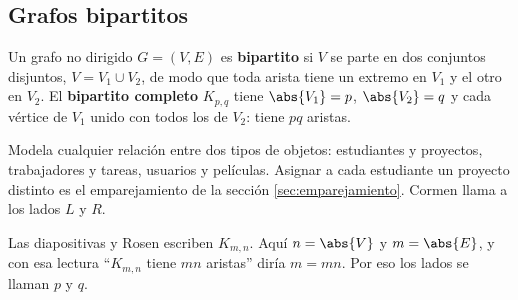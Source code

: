 \documentclass[11pt,letterpaper]{article}
\begin{document}

\subsection*{Grafos bipartitos}

\begin{definicion}
  \label{def:bipartito}
  Un grafo no dirigido $G = (V, E)$ es \textbf{bipartito} si $V$ se
  parte en dos conjuntos disjuntos, $V = V_1 \cup V_2$, de modo que
  toda arista tiene un extremo en $V_1$ y el otro en $V_2$. El
  \textbf{bipartito completo} $K_{p,q}$ tiene $\abs{V_1} = p$,
  $\abs{V_2} = q$ y cada vértice de $V_1$ unido con todos los de
  $V_2$: tiene $pq$ aristas.
\end{definicion}

Modela cualquier relación entre dos tipos de objetos: estudiantes y
proyectos, trabajadores y tareas, usuarios y películas. Asignar a
cada estudiante un proyecto distinto es el emparejamiento de la
sección \ref{sec:emparejamiento}. Cormen llama a los lados $L$ y $R$.

\begin{center}
\end{center}

\begin{observacion}
  Las diapositivas y Rosen escriben $K_{m,n}$. Aquí $n = \abs{V}$ y
  $m = \abs{E}$, y con esa lectura ``$K_{m,n}$ tiene $mn$ aristas''
  diría $m = mn$. Por eso los lados se llaman $p$ y $q$.
\end{observacion}
\end{document}
